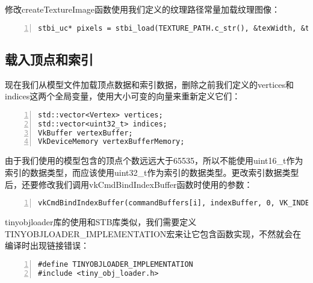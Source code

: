 \documentclass{ctexart}
\begin{document}
修改createTextureImage函数使用我们定义的纹理路径常量加载纹理图像：

\begin{lstlisting}[language={[ANSI]C},keywordstyle=\color{blue!70},commentstyle=\color{red!50!green!50!blue!50},frame=shadowbox, rulesepcolor=\color{red!20!green!20!blue!20},basicstyle=\small,numbers=left, numberstyle=\tiny,breaklines=true]
stbi_uc* pixels = stbi_load(TEXTURE_PATH.c_str(), &texWidth, &texHeight, &texChannels, STBI_rgb_alpha);
\end{lstlisting}

\subsection{载入顶点和索引}

现在我们从模型文件加载顶点数据和索引数据，删除之前我们定义的vertices和indices这两个全局变量，使用大小可变的向量来重新定义它们：

\begin{lstlisting}[language={[ANSI]C},keywordstyle=\color{blue!70},commentstyle=\color{red!50!green!50!blue!50},frame=shadowbox, rulesepcolor=\color{red!20!green!20!blue!20},basicstyle=\small,numbers=left, numberstyle=\tiny,breaklines=true]
std::vector<Vertex> vertices;
std::vector<uint32_t> indices;
VkBuffer vertexBuffer;
VkDeviceMemory vertexBufferMemory;
\end{lstlisting}

由于我们使用的模型包含的顶点个数远远大于65535，所以不能使用uint16\_t作为索引的数据类型，而应该使用uint32\_t作为索引的数据类型。更改索引数据类型后，还要修改我们调用vkCmdBindIndexBuffer函数时使用的参数：

\begin{lstlisting}[language={[ANSI]C},keywordstyle=\color{blue!70},commentstyle=\color{red!50!green!50!blue!50},frame=shadowbox, rulesepcolor=\color{red!20!green!20!blue!20},basicstyle=\small,numbers=left, numberstyle=\tiny,breaklines=true]
vkCmdBindIndexBuffer(commandBuffers[i], indexBuffer, 0, VK_INDEX_TYPE_UINT32);
\end{lstlisting}

tinyobjloader库的使用和STB库类似，我们需要定义TINYOBJLOADER\_IMPLEMENTATION宏来让它包含函数实现，不然就会在编译时出现链接错误：

\begin{lstlisting}[language={[ANSI]C},keywordstyle=\color{blue!70},commentstyle=\color{red!50!green!50!blue!50},frame=shadowbox, rulesepcolor=\color{red!20!green!20!blue!20},basicstyle=\small,numbers=left, numberstyle=\tiny,breaklines=true]
#define TINYOBJLOADER_IMPLEMENTATION
#include <tiny_obj_loader.h>
\end{lstlisting}
\end{document}
